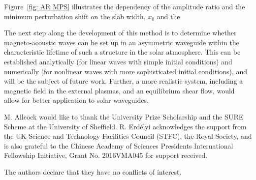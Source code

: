 \documentclass[namedreferences]{solarphysics}
\numberwithin{equation}{section}
\begin{document}
\begin{article}
Figure~\ref{fig: AR MPS} illustrates the dependency of the amplitude ratio and the minimum perturbation shift on the slab width, $x_0$ and the 

The next step along the development of this method is to determine whether magneto-acoustic waves can be set up in an asymmetric waveguide within the characteristic lifetime of such a structure in the solar atmosphere. This can be established analytically (for linear waves with simple initial conditions) and numerically (for nonlinear waves with more sophisticated initial conditions), and will be the subject of future work. Further, a more realistic system, including a magnetic field in the external plasmas, and an equilibrium shear flow, would allow for better application to solar waveguides.

%

%
\begin{acks}
M. Allcock would like to thank the University Prize Scholarship and the SURE Scheme at the University of Sheffield. R. Erd\'{e}lyi acknowledges the support from the UK Science and Technology Facilities Council (STFC), the Royal Society, and is also  grateful to the Chinese Academy of Sciences Presidents International Fellowship Initiative, Grant No. 2016VMA045 for support received. 
\end{acks}

\begin{acks}
The authors declare that they have no conflicts of interest.
\end{acks}





\end{article} 
\end{document}
